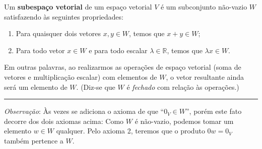 \begin{definition}
	Um \textbf{subespaço vetorial} de um espaço vetorial $V$ é um subconjunto não-vazio $W$ satisfazendo às seguintes propriedades:
	
	\begin{enumerate}
		\item Para quaisquer dois vetores $x,y\in W$, temos que $x+y\in W$;
		\item Para todo vetor $x\in W$ e para todo escalar $\lambda\in\mathbb{R}$, temos que $\lambda x\in W$.
	\end{enumerate}
	
	Em outras palavras, ao realizarmos as operações de espaço vetorial (soma de vetores e multiplicação escalar) com elementos de $W$, o vetor resultante ainda será um elemento de $W$. (Diz-se que $W$ é \textit{fechado} com relação às operações.)
	
	\hrule
	
	\textit{Observação}: Às vezes se adiciona o axioma de que ``$0_V\in W$'', porém este fato decorre dos dois axiomas acima: Como $W$ é não-vazio, podemos tomar um elemento $w\in W$ qualquer. Pelo axioma 2, teremos que o produto $0w=0_V$ também pertence a $W$.
\end{definition}
